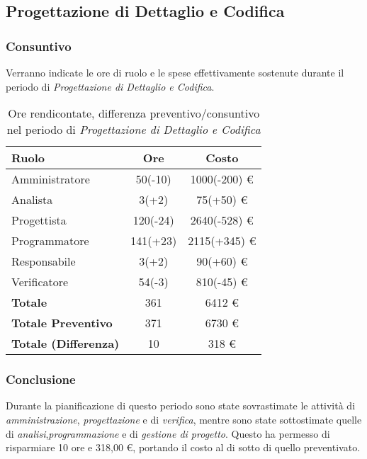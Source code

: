 \subsection{Progettazione di Dettaglio e Codifica}
\subsubsection{Consuntivo}
Verranno indicate le ore di ruolo e le spese effettivamente sostenute durante il periodo di \textit{Progettazione di Dettaglio e Codifica}.

\begin{table}[H]
	\centering
	\begin{tabular}{ l c c }
		\textbf{Ruolo} & \textbf{Ore} & \textbf{Costo} \\
		\hline
		Amministratore & 50(-10) & 1000(-200) \euro{} \\
		Analista & 3(+2) & 75(+50) \euro{} \\
		Progettista & 120(-24) & 2640(-528) \euro{} \\ %
		Programmatore & 141(+23) & 2115(+345) \euro{} \\ %
		Responsabile & 3(+2) & 90(+60) \euro{} \\
		Verificatore & 54(-3) & 810(-45) \euro{} \\
		\hline
		\textbf{Totale \glossaryItem{Consuntivo}} & 361 & 6412 \euro{} \\
		\hline
		\textbf{Totale Preventivo} & 371 & 6730 \euro{} \\
		\hline
		\textbf{Totale (Differenza)} & 10 & 318 \euro{} \\
		\hline
	\end{tabular}
	\caption{Ore rendicontate, differenza preventivo/consuntivo nel periodo di \textit{Progettazione di Dettaglio e Codifica}}
\end{table}



\subsubsection{Conclusione}
Durante la pianificazione di questo periodo sono state sovrastimate le attivit\`a di \textit{amministrazione}, \textit{progettazione} e di \textit{verifica}, mentre sono state sottostimate quelle di \textit{analisi},\textit{programmazione} e di \textit{gestione di progetto}.
Questo ha permesso di risparmiare 10 ore e 318,00 \euro{}, portando il costo  al di sotto di quello preventivato.
